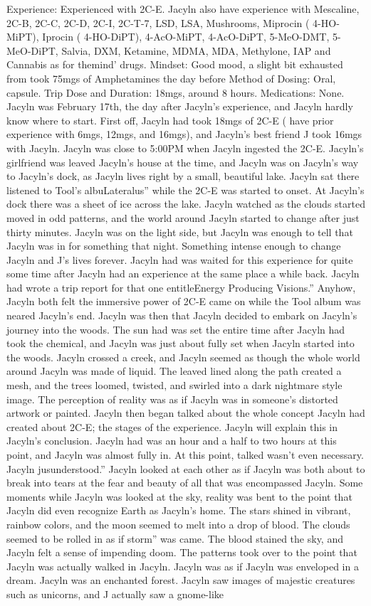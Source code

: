\documentclass[12pt]{book}
\begin{document}
Experience: Experienced with 2C-E. Jacyln also have experience with Mescaline, 2C-B, 2C-C, 2C-D, 2C-I, 2C-T-7, LSD, LSA, Mushrooms, Miprocin ( 4-HO-MiPT), Iprocin ( 4-HO-DiPT), 4-AcO-MiPT, 4-AcO-DiPT, 5-MeO-DMT, 5-MeO-DiPT, Salvia, DXM, Ketamine, MDMA, MDA, Methylone, IAP and Cannabis as for themind' drugs. Mindset: Good mood, a slight bit exhausted from took 75mgs of Amphetamines the day before Method of Dosing: Oral, capsule. Trip Dose and Duration: 18mgs, around 8 hours. Medications: None. Jacyln was February 17th, the day after Jacyln's experience, and Jacyln hardly know where to start. First off, Jacyln had took 18mgs of 2C-E ( have prior experience with 6mgs, 12mgs, and 16mgs), and Jacyln's best friend J took 16mgs with Jacyln. Jacyln was close to 5:00PM when Jacyln ingested the 2C-E. Jacyln's girlfriend was leaved Jacyln's house at the time, and Jacyln was on Jacyln's way to Jacyln's dock, as Jacyln lives right by a small, beautiful lake. Jacyln sat there listened to Tool's albuLateralus'' while the 2C-E was started to onset. At Jacyln's dock there was a sheet of ice across the lake. Jacyln watched as the clouds started moved in odd patterns, and the world around Jacyln started to change after just thirty minutes. Jacyln was on the light side, but Jacyln was enough to tell that Jacyln was in for something that night. Something intense enough to change Jacyln and J's lives forever. Jacyln had was waited for this experience for quite some time after Jacyln had an experience at the same place a while back. Jacyln had wrote a trip report for that one entitleEnergy Producing Visions.'' Anyhow, Jacyln both felt the immersive power of 2C-E came on while the Tool album was neared Jacyln's end. Jacyln was then that Jacyln decided to embark on Jacyln's journey into the woods. The sun had was set the entire time after Jacyln had took the chemical, and Jacyln was just about fully set when Jacyln started into the woods. Jacyln crossed a creek, and Jacyln seemed as though the whole world around Jacyln was made of liquid. The leaved lined along the path created a mesh, and the trees loomed, twisted, and swirled into a dark nightmare style image. The perception of reality was as if Jacyln was in someone's distorted artwork or painted. Jacyln then began talked about the whole concept Jacyln had created about 2C-E; the stages of the experience. Jacyln will explain this in Jacyln's conclusion. Jacyln had was an hour and a half to two hours at this point, and Jacyln was almost fully in. At this point, talked wasn't even necessary. Jacyln jusunderstood.'' Jacyln looked at each other as if Jacyln was both about to break into tears at the fear and beauty of all that was encompassed Jacyln. Some moments while Jacyln was looked at the sky, reality was bent to the point that Jacyln did even recognize Earth as Jacyln's home. The stars shined in vibrant, rainbow colors, and the moon seemed to melt into a drop of blood. The clouds seemed to be rolled in as if storm'' was came. The blood stained the sky, and Jacyln felt a sense of impending doom. The patterns took over to the point that Jacyln was actually walked in Jacyln. Jacyln was as if Jacyln was enveloped in a dream. Jacyln was an enchanted forest. Jacyln saw images of majestic creatures such as unicorns, and J actually saw a gnome-like 
\end{document}
